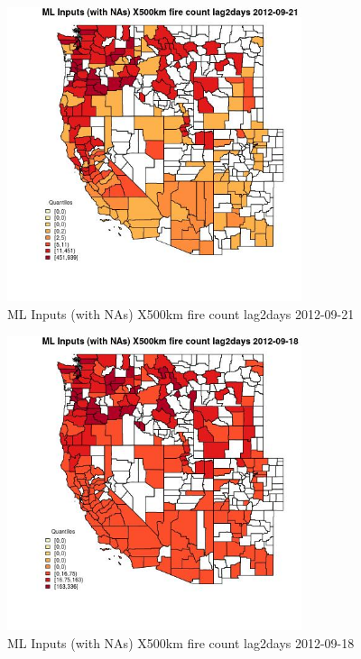 \begin{figure} 
\centering  
\includegraphics[width=0.77\textwidth]{Code_Outputs/Report_ML_input_PM25_Step4_part_e_de_duplicated_aves_compiled_2019-05-14wNAs_CountyX500km_fire_count_lag2daysMean2012-09-21_2012-09-21.jpg} 
\caption{\label{fig:Report_ML_input_PM25_Step4_part_e_de_duplicated_aves_compiled_2019-05-14wNAsCountyX500km_fire_count_lag2daysMean2012-09-21_2012-09-21}ML Inputs (with NAs) X500km fire count lag2days 2012-09-21} 
\end{figure} 
 

\begin{figure} 
\centering  
\includegraphics[width=0.77\textwidth]{Code_Outputs/Report_ML_input_PM25_Step4_part_e_de_duplicated_aves_compiled_2019-05-14wNAs_CountyX500km_fire_count_lag2daysMean2012-09-18_2012-09-18.jpg} 
\caption{\label{fig:Report_ML_input_PM25_Step4_part_e_de_duplicated_aves_compiled_2019-05-14wNAsCountyX500km_fire_count_lag2daysMean2012-09-18_2012-09-18}ML Inputs (with NAs) X500km fire count lag2days 2012-09-18} 
\end{figure} 
 

